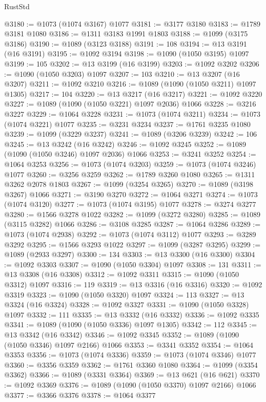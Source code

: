 \begin{lexlean}{RustStd}
\begin{coremodule}
@3180 := @1073 (@1074 @3167) @1077
@3181 := @3177 @3180
@3183 := @1789 @3181 @1080
@3186 := @1311 @3183 @1991 @1803
@3188 := @1099 (@3175 @3186)
@3190 := @1089 (@3123 @3188)
@3191 := 108
@3194 := @13 @3191 (@16 @3191)
@3195 := @1092 @3194
@3198 := @1090 (@1050 @3195) @1097
@3199 := 105
@3202 := @13 @3199 (@16 @3199)
@3203 := @1092 @3202
@3206 := @1090 (@1050 @3203) @1097
@3207 := 103
@3210 := @13 @3207 (@16 @3207)
@3211 := @1092 @3210
@3216 := @1089 (@1090 (@1050 @3211) @1097 @1305)
@3217 := 104
@3220 := @13 @3217 (@16 @3217)
@3221 := @1092 @3220
@3227 := @1089 (@1090 (@1050 @3221) @1097 @2036) @1066
@3228 := @3216 @3227
@3229 := @1064 @3228
@3231 := @1073 (@1074 @3211)
@3234 := @1073 (@1074 @3221) @1077
@3235 := @3231 @3234
@3237 := @1761 @3235 @1080
@3239 := @1099 (@3229 @3237)
@3241 := @1089 (@3206 @3239)
@3242 := 106
@3245 := @13 @3242 (@16 @3242)
@3246 := @1092 @3245
@3252 := @1089 (@1090 (@1050 @3246) @1097 @2036) @1066
@3253 := @3241 @3252
@3254 := @1064 @3253
@3256 := @1073 (@1074 @3203)
@3259 := @1073 (@1074 @3246) @1077
@3260 := @3256 @3259
@3262 := @1789 @3260 @1080
@3265 := @1311 @3262 @2078 @1803
@3267 := @1099 (@3254 @3265)
@3270 := @1089 (@3198 @3267) @1066
@3271 := @3190 @3270
@3272 := @1064 @3271
@3274 := @1073 (@1074 @3120)
@3277 := @1073 (@1074 @3195) @1077
@3278 := @3274 @3277
@3280 := @1566 @3278 @1022
@3282 := @1099 (@3272 @3280)
@3285 := @1089 (@3115 @3282) @1066
@3286 := @3108 @3285
@3287 := @1064 @3286
@3289 := @1073 (@1074 @2938)
@3292 := @1073 (@1074 @3112) @1077
@3293 := @3289 @3292
@3295 := @1566 @3293 @1022
@3297 := @1099 (@3287 @3295)
@3299 := @1089 (@2933 @3297)
@3300 := 134
@3303 := @13 @3300 (@16 @3300)
@3304 := @1092 @3303
@3307 := @1090 (@1050 @3304) @1097
@3308 := 131
@3311 := @13 @3308 (@16 @3308)
@3312 := @1092 @3311
@3315 := @1090 (@1050 @3312) @1097
@3316 := 119
@3319 := @13 @3316 (@16 @3316)
@3320 := @1092 @3319
@3323 := @1090 (@1050 @3320) @1097
@3324 := 113
@3327 := @13 @3324 (@16 @3324)
@3328 := @1092 @3327
@3331 := @1090 (@1050 @3328) @1097
@3332 := 111
@3335 := @13 @3332 (@16 @3332)
@3336 := @1092 @3335
@3341 := @1089 (@1090 (@1050 @3336) @1097 @1305)
@3342 := 112
@3345 := @13 @3342 (@16 @3342)
@3346 := @1092 @3345
@3352 := @1089 (@1090 (@1050 @3346) @1097 @2166) @1066
@3353 := @3341 @3352
@3354 := @1064 @3353
@3356 := @1073 (@1074 @3336)
@3359 := @1073 (@1074 @3346) @1077
@3360 := @3356 @3359
@3362 := @1761 @3360 @1080
@3364 := @1099 (@3354 @3362)
@3366 := @1089 (@3331 @3364)
@3369 := @13 @621 (@16 @621)
@3370 := @1092 @3369
@3376 := @1089 (@1090 (@1050 @3370) @1097 @2166) @1066
@3377 := @3366 @3376
@3378 := @1064 @3377

\end{coremodule}
\end{lexlean}
